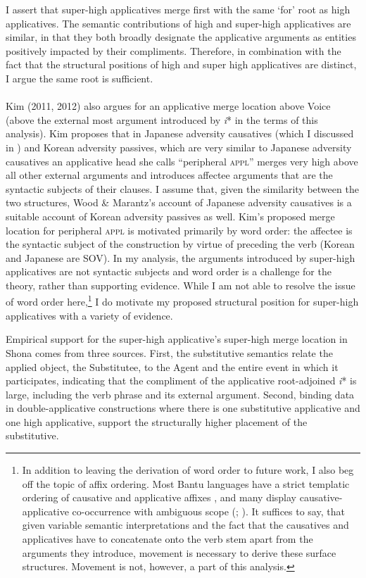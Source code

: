 \documentclass[output=paper]{langscibook}
\begin{document}
I assert that super-high applicatives merge first with the same ‘for’ root as high applicatives. The semantic contributions of high and super-high applicatives are similar, in that they both broadly designate the applicative arguments as entities positively impacted by their compliments. Therefore, in combination with the fact that the structural positions of high and super high applicatives are distinct, I argue the same root is sufficient.\\
\\
Kim (2011, 2012) also argues for an applicative merge location above Voice (above the external most argument introduced by \textit{i}* in the terms of this analysis). Kim proposes that in Japanese adversity causatives (which I discussed in ) and Korean adversity passives, which are very similar to Japanese adversity causatives an applicative head she calls “peripheral \textsc{appl}” merges very high above all other external arguments and introduces affectee arguments that are the syntactic subjects of their clauses. I assume that, given the similarity between the two structures, Wood \& Marantz’s account of Japanese adversity causatives is a suitable account of Korean adversity passives as well. Kim’s proposed merge location for peripheral \textsc{appl} is motivated primarily by word order: the affectee is the syntactic subject of the construction by virtue of preceding the verb (Korean and Japanese are SOV). In my analysis, the arguments introduced by super-high applicatives are not syntactic subjects and word order is a challenge for the theory, rather than supporting evidence. While I am not able to resolve the issue of word order here,\footnote{In addition to leaving the derivation of word order to future work, I also beg off the topic of affix ordering. Most Bantu languages have a strict templatic ordering of causative and applicative affixes \citep{Good2005}, and many display causative-applicative co-occurrence with ambiguous scope (\citealt{Baker1985}; \citealt{Hyman2002}). It suffices to say, that given variable semantic interpretations and the fact that the causatives and applicatives have to concatenate onto the verb stem apart from the arguments they introduce, movement is necessary to derive these surface structures. Movement is not, however, a part of this analysis.}  I do motivate my proposed structural position for super-high applicatives with a variety of evidence. 



Empirical support for the super-high applicative’s super-high merge location in Shona comes from three sources. First, the substitutive semantics relate the applied object, the Substitutee, to the Agent and the entire event in which it participates, indicating that the compliment of the applicative root-adjoined \textit{i}* is large, including the verb phrase and its external argument.  Second, binding data in double-applicative constructions where there is one substitutive applicative and one high applicative, support the structurally higher placement of the substitutive. 
\end{document}
